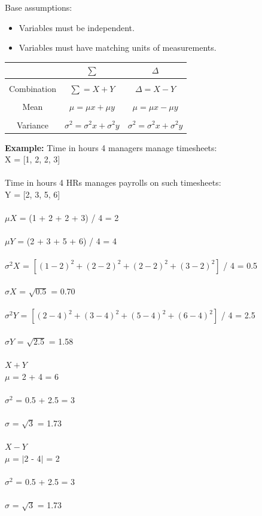 \documentclass{article}
\begin{document}
Base assumptions:
\begin{itemize}
    \item Variables must be independent.
    \item Variables must have matching units of measurements.
\end{itemize}

\begin{center}
\begin{tabular}{|c|c|c|}
\hline
 & $\sum$ & $\Delta$  \\ \hline
&&\\[-1em]
Combination & $\sum = X + Y $ & $\Delta = X - Y$ \\ \hline
&&\\[-1em]
Mean & $\mu = \mu x + \mu y $ & $\mu = \mu x - \mu y$ \\ \hline
&&\\[-1em]
Variance & $\sigma^2 = \sigma^2 x + \sigma^2 y$ & $\sigma^2 = \sigma^2 x + \sigma^2 y$ \\
\hline
\end{tabular}
\end{center}

\textbf{Example:}
Time in hours 4 managers manage timesheets: \\ 
X = [1, 2, 2, 3] \\ 
\mbox{} \\
Time in hours 4 HRs manages payrolls on such timesheets: \\ 
Y = [2, 3, 5, 6] \\ 
\mbox{} \\

$\mu X$ = (1 + 2 + 2 + 3) / 4 = 2 \\
\mbox{} \\
$\mu Y$ = (2 + 3 + 5 + 6) / 4 = 4 \\ 
\mbox{} \\
$\sigma^2 X$ = $[(1 - 2)^2 + (2 - 2)^2 + (2 - 2)^2 + (3 - 2)^2 ]$ / 4 = 0.5  \\
\mbox{} \\
$\sigma X$ =  $\sqrt{0.5}$ = 0.70 \\ 
\mbox{} \\
$\sigma^2 Y$ = $[(2 - 4)^2 + (3 - 4)^2 + (5 - 4)^2 + (6 - 4)^2]$ / 4 = 2.5  \\
\mbox{} \\
$\sigma Y$ =  $\sqrt{2.5}$ = 1.58 \\
\mbox{} \\
$X + Y$ \\
$\mu$ = 2 + 4 = 6 \\
\mbox{} \\
$\sigma^2$ = 0.5 + 2.5 = 3 \\ 
\mbox{} \\
$\sigma$ = $\sqrt{3}$ = 1.73 \\ 
\mbox{} \\
$X - Y$ \\ 
$\mu$ = $|$2 - 4$|$ = 2 \\ 
\mbox{} \\
$\sigma^2$ = 0.5 + 2.5 = 3 \\ 
\mbox{} \\
$\sigma$ = $\sqrt{3}$ = 1.73 \\
\end{document}
